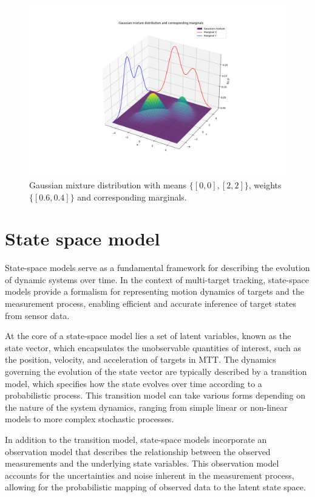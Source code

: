 \begin{figure}[htbp]
    \centering
    \includegraphics[width=1\textwidth]{text/chapter_01/imgs/gaussMix_with_marginals}
    \caption{Gaussian mixture distribution with means $\{[0,0], [2,2]\}$, weights $\{[0.6, 0.4]\}$ and corresponding marginals.}
    \label{fig:gaussMixWithMarginals}
\end{figure}

    \section{State space model}
\label{sec:stateSpaceModel}
State-space models serve as a fundamental framework for describing the evolution of dynamic systems over time. In the context of multi-target tracking, state-space models provide a formalism for representing motion dynamics of targets and the measurement process, enabling efficient and accurate inference of target states from sensor data.

At the core of a state-space model lies a set of latent variables, known as the state vector, which encapsulates the
unobservable quantities of interest, such as the position, velocity, and acceleration of targets in MTT. The dynamics governing the evolution of the state vector are typically described by a transition model, which specifies how the state evolves over time according to a probabilistic process. This transition model can take various forms depending on the nature of the system dynamics, ranging from simple linear or non-linear models to more complex stochastic processes.

In addition to the transition model, state-space models incorporate an observation model that describes the relationship between the observed measurements and the underlying state variables. This observation model accounts for the uncertainties and noise inherent in the measurement process, allowing for the probabilistic mapping of observed data to the latent state space.

